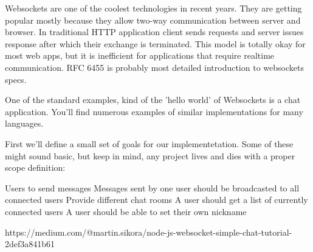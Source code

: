 Websockets are one of the coolest technologies in recent years. They are getting popular mostly because they allow two-way communication between server and browser. In traditional HTTP application client sends requests and server issues response after which their exchange is terminated. This model is totally okay for most web apps, but it is inefficient for applications that require realtime communication. RFC 6455 is probably most detailed introduction to websockets specs.

One of the standard examples, kind of the 'hello world' of Websockets is a chat application. You'll find numerous examples of similar implementations for many languages.

First we'll define a small set of goals for our implementetation. Some of these might sound basic, but keep in mind, any project lives and dies with a proper scope definition:

    Users to send messages
    Messages sent by one user should be broadcasted to all connected users
    Provide different chat rooms
    A user should get a list of currently connected users
    A user should be able to set their own nickname

https://medium.com/@martin.sikora/node-js-websocket-simple-chat-tutorial-2def3a841b61
